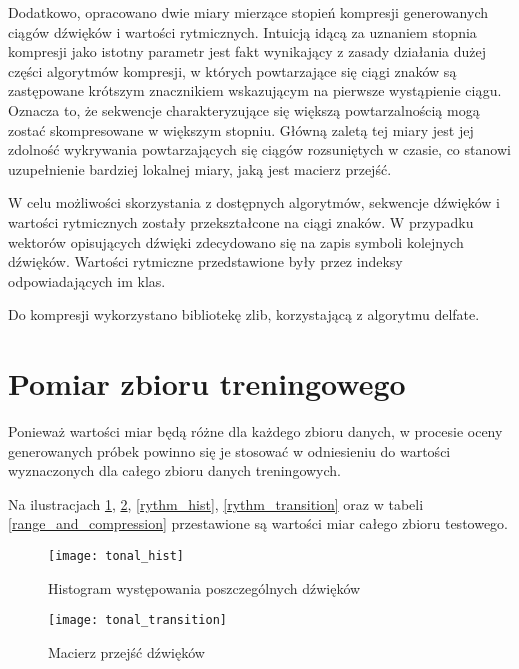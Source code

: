 {{        Dodatkowo, opracowano dwie miary mierzące stopień kompresji generowanych ciągów dźwięków i wartości rytmicznych. 
        Intuicją idącą za uznaniem stopnia kompresji jako istotny parametr jest fakt wynikający z zasady działania dużej części
        algorytmów kompresji, w których powtarzające się ciągi znaków są zastępowane krótszym znacznikiem wskazującym na pierwsze 
        wystąpienie ciągu. 
        Oznacza to, że sekwencje charakteryzujące się większą powtarzalnością mogą zostać skompresowane w większym stopniu.
        Główną zaletą tej miary jest jej zdolność wykrywania powtarzających się ciągów rozsuniętych w czasie, co stanowi uzupełnienie 
        bardziej lokalnej miary, jaką jest macierz przejść.

        W celu możliwości skorzystania z dostępnych algorytmów, sekwencje dźwięków i wartości rytmicznych zostały przekształcone
        na ciągi znaków. W przypadku wektorów opisujących dźwięki zdecydowano się na zapis symboli kolejnych dźwięków. Wartości
        rytmiczne przedstawione były przez indeksy odpowiadających im klas. 

        Do kompresji wykorzystano bibliotekę zlib, korzystającą z algorytmu delfate.
    }

    \section{Pomiar zbioru treningowego}
    {
        Ponieważ wartości miar będą różne dla każdego zbioru danych, w procesie oceny generowanych próbek powinno się je 
        stosować w odniesieniu do wartości wyznaczonych dla całego zbioru danych treningowych.
        
        Na ilustracjach \ref{tonal_hist}, \ref{tonal_transition}, \ref{rythm_hist}, \ref{rythm_transition} oraz w tabeli \ref{range_and_compression} 
        przestawione są wartości miar całego zbioru testowego.

        \begin{figure}
            \centering
            \texttt{[image: tonal\_hist]}
            \caption{Histogram występowania poszczególnych dźwięków}
            \label{tonal_hist}
        \end{figure}

        \begin{figure}
            \centering
            \texttt{[image: tonal\_transition]}
            \caption{Macierz przejść dźwięków}
            \label{tonal_transition}
        \end{figure}

}}
